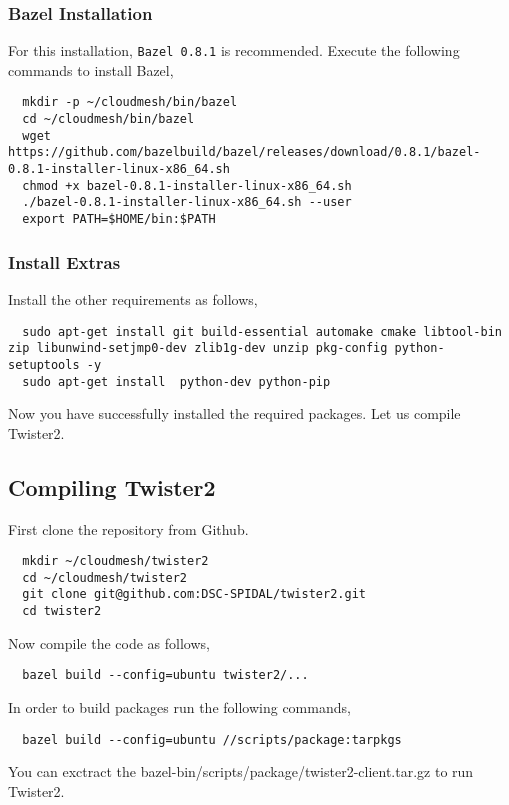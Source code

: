 \subsubsection{Bazel Installation}\label{s:s:twister2-bazel}

For this installation, \verb|Bazel 0.8.1| is recommended.
Execute the following commands to install Bazel,

\begin{lstlisting}
  mkdir -p ~/cloudmesh/bin/bazel
  cd ~/cloudmesh/bin/bazel
  wget https://github.com/bazelbuild/bazel/releases/download/0.8.1/bazel-0.8.1-installer-linux-x86_64.sh
  chmod +x bazel-0.8.1-installer-linux-x86_64.sh
  ./bazel-0.8.1-installer-linux-x86_64.sh --user
  export PATH=$HOME/bin:$PATH
\end{lstlisting}

\subsubsection{Install Extras}

Install the other requirements as follows,

\begin{lstlisting}
  sudo apt-get install git build-essential automake cmake libtool-bin zip libunwind-setjmp0-dev zlib1g-dev unzip pkg-config python-setuptools -y
  sudo apt-get install  python-dev python-pip
\end{lstlisting}

Now you have successfully installed the required packages.  Let us
compile Twister2.

\subsection{Compiling Twister2}

First clone the repository from Github.

\begin{lstlisting}
  mkdir ~/cloudmesh/twister2
  cd ~/cloudmesh/twister2
  git clone git@github.com:DSC-SPIDAL/twister2.git
  cd twister2
\end{lstlisting}

Now compile the code as follows,

\begin{lstlisting}
  bazel build --config=ubuntu twister2/...
\end{lstlisting}

In order to build packages run the following commands,

\begin{lstlisting}
  bazel build --config=ubuntu //scripts/package:tarpkgs
\end{lstlisting}

You can exctract the bazel-bin/scripts/package/twister2-client.tar.gz to run Twister2.
